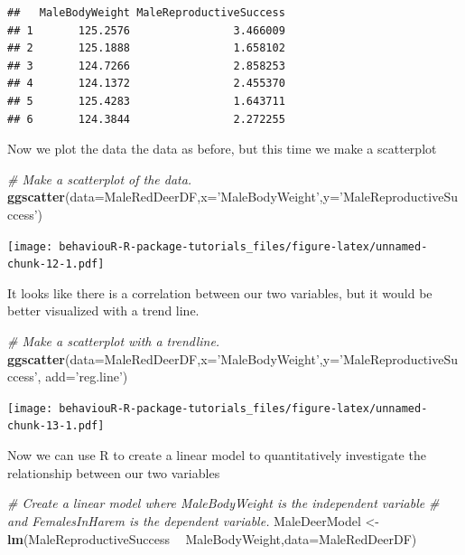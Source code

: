 \documentclass[]{book}
\newenvironment{Shaded}{\begin{snugshade}}{\end{snugshade}}
\newcommand{\CommentTok}[1]{\textcolor[rgb]{0.56,0.35,0.01}{\textit{#1}}}
\newcommand{\DataTypeTok}[1]{\textcolor[rgb]{0.13,0.29,0.53}{#1}}
\newcommand{\KeywordTok}[1]{\textcolor[rgb]{0.13,0.29,0.53}{\textbf{#1}}}
\newcommand{\NormalTok}[1]{#1}
\newcommand{\OperatorTok}[1]{\textcolor[rgb]{0.81,0.36,0.00}{\textbf{#1}}}
\newcommand{\StringTok}[1]{\textcolor[rgb]{0.31,0.60,0.02}{#1}}
\begin{document}
\begin{verbatim}
##   MaleBodyWeight MaleReproductiveSuccess
## 1       125.2576                3.466009
## 2       125.1888                1.658102
## 3       124.7266                2.858253
## 4       124.1372                2.455370
## 5       125.4283                1.643711
## 6       124.3844                2.272255
\end{verbatim}

Now we plot the data the data as before, but this time we make a scatterplot

\begin{Shaded}
\begin{Highlighting}[]
\CommentTok{# Make a scatterplot of the data.}
\KeywordTok{ggscatter}\NormalTok{(}\DataTypeTok{data=}\NormalTok{MaleRedDeerDF,}\DataTypeTok{x=}\StringTok{'MaleBodyWeight'}\NormalTok{,}\DataTypeTok{y=}\StringTok{'MaleReproductiveSuccess'}\NormalTok{)}
\end{Highlighting}
\end{Shaded}

\texttt{[image: behaviouR-R-package-tutorials\_files/figure-latex/unnamed-chunk-12-1.pdf]}

It looks like there is a correlation between our two variables, but it would be better visualized with a trend line.

\begin{Shaded}
\begin{Highlighting}[]
\CommentTok{# Make a scatterplot with a trendline.}
\KeywordTok{ggscatter}\NormalTok{(}\DataTypeTok{data=}\NormalTok{MaleRedDeerDF,}\DataTypeTok{x=}\StringTok{'MaleBodyWeight'}\NormalTok{,}\DataTypeTok{y=}\StringTok{'MaleReproductiveSuccess'}\NormalTok{,}
          \DataTypeTok{add=}\StringTok{'reg.line'}\NormalTok{)}
\end{Highlighting}
\end{Shaded}

\texttt{[image: behaviouR-R-package-tutorials\_files/figure-latex/unnamed-chunk-13-1.pdf]}

Now we can use R to create a linear model to quantitatively investigate the relationship between our two variables

\begin{Shaded}
\begin{Highlighting}[]
\CommentTok{# Create a linear model where MaleBodyWeight is the independent variable}
\CommentTok{# and FemalesInHarem is the dependent variable.}
\NormalTok{MaleDeerModel <-}\StringTok{ }\KeywordTok{lm}\NormalTok{(MaleReproductiveSuccess }\OperatorTok{~}\StringTok{ }\NormalTok{MaleBodyWeight,}\DataTypeTok{data=}\NormalTok{MaleRedDeerDF)}
\end{Highlighting}
\end{Shaded}
\end{document}
